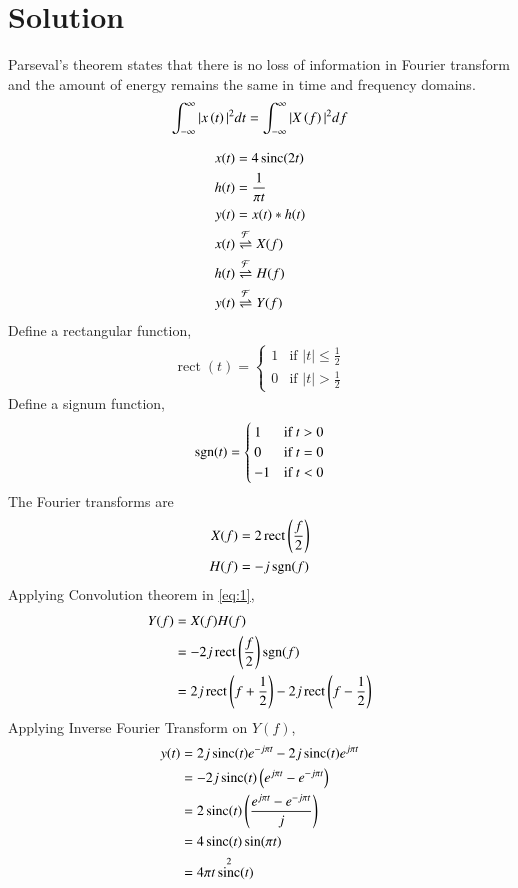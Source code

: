 \documentclass[journal,12pt,twocolumn]{IEEEtran}
\DeclareMathOperator{\sinc}{sinc}
\DeclareMathOperator{\rect}{rect}
\begin{document}
\section*{Solution}
\begin{lemma}
Parseval's theorem states that there is no loss of information in Fourier transform and the amount of energy remains the same in time and frequency domains.
\begin{align}
    \int_{-\infty}^{\infty} |x\left(t\right)|^{2} dt = \int_{-\infty}^{\infty} |X\left(f\right)|^{2} df
\end{align}
\end{lemma}
\begin{align}
    x(t) &= 4\sinc(2t)\\
    h(t) &= \frac{1}{\pi t}\\
    y(t) &= x(t) * h(t) \label{eq:1}\\
    x(t) &\fourier{X(f)}\\
    h(t) &\fourier{H(f)}\\
    y(t) &\fourier{Y(f)}
\end{align}
Define a rectangular function,
\begin{align}
    \rect(t) =
    \begin{cases}
    1 & \text{if } |t| \leq \frac{1}{2}\\
    0 & \text{if } |t| > \frac{1}{2}
    \end{cases}
\end{align}
Define a signum function,
\begin{align}
    \mathop{\mathrm{sgn}}(t) =
    \begin{cases}
    1 & \text{if } t > 0\\
    0 & \text{if } t = 0\\
    -1 & \text{if } t < 0
    \end{cases}
\end{align}
The Fourier transforms are
\begin{align}
    X(f) &= 2\rect\brak{\frac{f}{2}}\\
    H(f) &= -j\sgn(f)
\end{align}
Applying Convolution theorem in \eqref{eq:1},
\begin{align}
    Y(f) &= X(f)H(f)\\
    &= -2j\rect\brak{\frac{f}{2}}\sgn(f)\\
    &= 2j\rect\brak{f + \frac{1}{2}} - 2j\rect\brak{f - \frac{1}{2}}
\end{align}
Applying Inverse Fourier Transform on $Y(f)$,
\begin{align}
    y(t) &= 2j\sinc(t)e^{-j\pi t} - 2j\sinc(t)e^{j\pi t}\\
    &= -2j\sinc(t)\brak{e^{j\pi t} - e^{-j\pi t}}\\
    &= 2\sinc(t)\brak{\frac{e^{j\pi t} - e^{-j\pi t}}{j}}\\
    &= 4\sinc(t)\sin(\pi t)\\
    &= 4\pi t\sinc^2(t)
\end{align}
\end{document}
